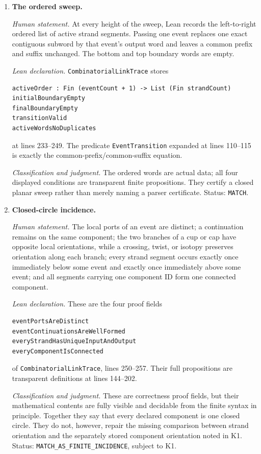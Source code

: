 \begin{enumerate}[label=\textbf{K\arabic*.},leftmargin=*]
\emph{Classification and judgment.}
This is explicit finite syntax, not an axiom.  Its birth and death constructors
are planar cups and caps, not Kirby $1$--$2$ births and deaths.  Status:
\texttt{MATCH}.

\item \textbf{The ordered sweep.}

\emph{Human statement.}
At every height of the sweep, Lean records the left-to-right ordered list of
active strand segments.  Passing one event replaces one exact contiguous
subword by that event's output word and leaves a common prefix and suffix
unchanged.  The bottom and top boundary words are empty.

\emph{Lean declaration.}
\texttt{CombinatorialLinkTrace} stores
\begin{verbatim}
activeOrder : Fin (eventCount + 1) -> List (Fin strandCount)
initialBoundaryEmpty
finalBoundaryEmpty
transitionValid
activeWordsNoDuplicates
\end{verbatim}
at lines 233--249.  The predicate \texttt{EventTransition} expanded at lines
110--115 is exactly the common-prefix/common-suffix equation.

\emph{Classification and judgment.}
The ordered words are actual data; all four displayed conditions are
transparent finite propositions.  They certify a closed planar sweep rather
than merely naming a parser certificate.  Status: \texttt{MATCH}.

\item \textbf{Closed-circle incidence.}

\emph{Human statement.}
The local ports of an event are distinct; a continuation remains on the same
component; the two branches of a cup or cap have opposite local orientations,
while a crossing, twist, or isotopy preserves orientation along each branch;
every strand segment occurs exactly once immediately below some event and
exactly once immediately above some event; and all segments carrying one
component ID form one connected component.

\emph{Lean declaration.}
These are the four proof fields
\begin{verbatim}
eventPortsAreDistinct
eventContinuationsAreWellFormed
everyStrandHasUniqueInputAndOutput
everyComponentIsConnected
\end{verbatim}
of \texttt{CombinatorialLinkTrace}, lines 250--257.  Their full propositions
are transparent definitions at lines 144--202.

\emph{Classification and judgment.}
These are correctness proof fields, but their mathematical contents are
fully visible and decidable from the finite syntax in principle.  Together
they say that every declared component is one closed circle.  They do not,
however, repair the missing comparison between strand orientation and the
separately stored component orientation noted in K1.  Status:
\nolinkurl{MATCH_AS_FINITE_INCIDENCE}, subject to K1.


\end{enumerate}
